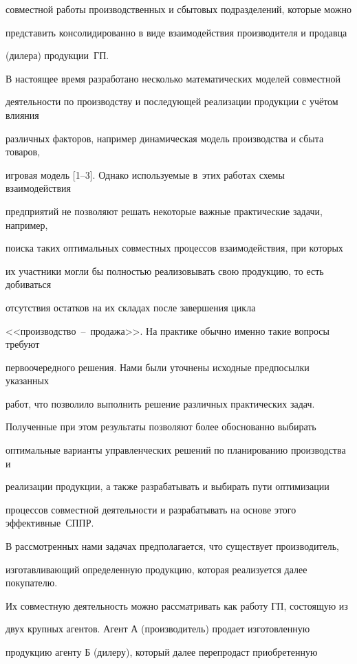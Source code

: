 совместной работы производственных и сбытовых подразделений, которые можно

представить консолидированно в виде взаимодействия производителя и продавца

(дилера) продукции~ГП.



В настоящее время разработано несколько математических моделей совместной

деятельности по производству и последующей реализации продукции с учётом влияния

различных факторов, например динамическая модель производства и сбыта товаров,

игровая модель [1--3]. Однако используемые в~этих работах схемы взаимодействия

предприятий не позволяют решать некоторые важные практические задачи, например,

поиска таких оптимальных совместных процессов взаимодействия, при которых

их участники могли бы полностью реализовывать свою продукцию, то есть добиваться

отсутствия остатков на их складах после завершения цикла

<<производство~--~продажа>>. На практике обычно именно такие вопросы требуют

первоочередного решения. Нами были уточнены исходные предпосылки указанных

работ, что позволило выполнить решение различных практических задач.

Полученные при этом результаты позволяют более обоснованно выбирать

оптимальные варианты управленческих решений по планированию производства и

реализации продукции, а также разрабатывать и выбирать пути оптимизации

процессов совместной деятельности и разрабатывать на основе этого эффективные~СППР.



В рассмотренных нами задачах предполагается, что существует производитель,

изготавливающий определенную продукцию, которая реализуется далее покупателю.

Их совместную деятельность можно рассматривать как работу ГП, состоящую из

двух крупных агентов. Агент А (производитель) продает изготовленную

продукцию агенту Б (дилеру), который далее перепродаст приобретенную

